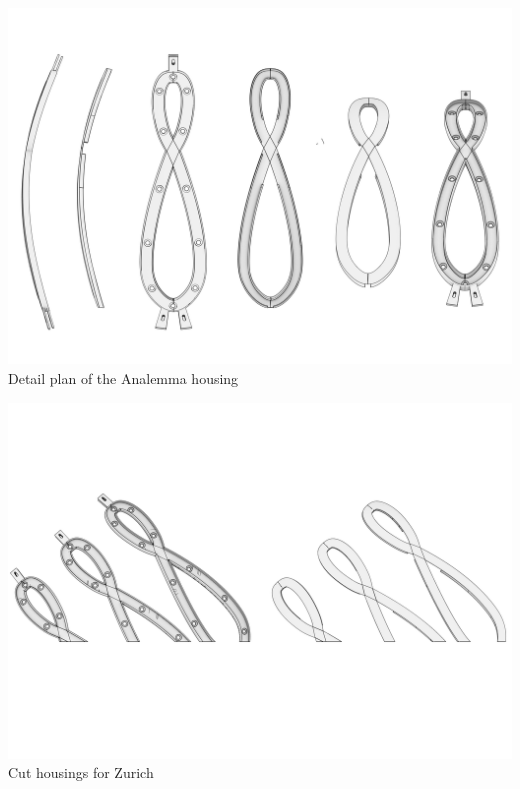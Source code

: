 \documentclass[a4paper,9pt]{article}
\begin{document}
 
     \begin{minipage}{0.48\linewidth}
        \centering
        \includegraphics[width=.85\linewidth]{Images/anallemma.png}
       \\
       {Detail plan of the Analemma housing}
         \label{partshousing}
    \end{minipage}
    \hfill
    \begin{minipage}{0.48\linewidth}
         \centering
        \includegraphics[width=.85\linewidth]{Images/cut.png}
        \quad
       \\{Cut housings for Zurich}
        \label{cut}
    \end{minipage}
    
\end{document}
